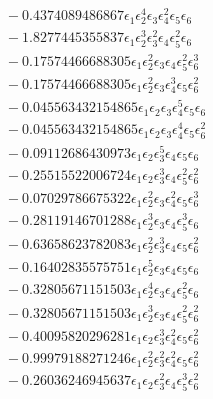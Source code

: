 \documentclass[10pt]{article}
\begin{document}
\begin{align*}
&{}  - 0.4374089486867 \epsilon_{1} \epsilon_{2}^{4} \epsilon_{3} \epsilon_{4}^{2} \epsilon_{5} \epsilon_{6} \\
&{}  - 1.8277445355837 \epsilon_{1} \epsilon_{2}^{3} \epsilon_{3}^{2} \epsilon_{4} \epsilon_{5}^{2} \epsilon_{6} \\
&{}  - 0.17574466688305 \epsilon_{1} \epsilon_{2}^{2} \epsilon_{3} \epsilon_{4} \epsilon_{5}^{2} \epsilon_{6}^{3} \\
&{}  - 0.17574466688305 \epsilon_{1} \epsilon_{2}^{2} \epsilon_{3} \epsilon_{4}^{3} \epsilon_{5} \epsilon_{6}^{2} \\
&{}  - 0.045563432154865 \epsilon_{1} \epsilon_{2} \epsilon_{3} \epsilon_{4}^{5} \epsilon_{5} \epsilon_{6} \\
&{}  - 0.045563432154865 \epsilon_{1} \epsilon_{2} \epsilon_{3} \epsilon_{4}^{4} \epsilon_{5} \epsilon_{6}^{2} \\
&{}  - 0.09112686430973 \epsilon_{1} \epsilon_{2} \epsilon_{3}^{5} \epsilon_{4} \epsilon_{5} \epsilon_{6} \\
&{}  - 0.25515522006724 \epsilon_{1} \epsilon_{2} \epsilon_{3}^{3} \epsilon_{4} \epsilon_{5}^{2} \epsilon_{6}^{2} \\
&{}  - 0.07029786675322 \epsilon_{1} \epsilon_{2}^{2} \epsilon_{3} \epsilon_{4}^{2} \epsilon_{5} \epsilon_{6}^{3} \\
&{}  - 0.28119146701288 \epsilon_{1} \epsilon_{2}^{3} \epsilon_{3} \epsilon_{4} \epsilon_{5}^{3} \epsilon_{6} \\
&{}  - 0.63658623782083 \epsilon_{1} \epsilon_{2}^{2} \epsilon_{3}^{3} \epsilon_{4} \epsilon_{5} \epsilon_{6}^{2} \\
&{}  - 0.16402835575751 \epsilon_{1} \epsilon_{2}^{5} \epsilon_{3} \epsilon_{4} \epsilon_{5} \epsilon_{6} \\
&{}  - 0.32805671151503 \epsilon_{1} \epsilon_{2}^{4} \epsilon_{3} \epsilon_{4} \epsilon_{5}^{2} \epsilon_{6} \\
&{}  - 0.32805671151503 \epsilon_{1} \epsilon_{2}^{3} \epsilon_{3} \epsilon_{4} \epsilon_{5}^{2} \epsilon_{6}^{2} \\
&{}  - 0.40095820296281 \epsilon_{1} \epsilon_{2} \epsilon_{3}^{3} \epsilon_{4}^{2} \epsilon_{5} \epsilon_{6}^{2} \\
&{}  - 0.99979188271246 \epsilon_{1} \epsilon_{2}^{2} \epsilon_{3}^{2} \epsilon_{4}^{2} \epsilon_{5} \epsilon_{6}^{2} \\
&{}  - 0.26036246945637 \epsilon_{1} \epsilon_{2} \epsilon_{3}^{2} \epsilon_{4} \epsilon_{5}^{3} \epsilon_{6}^{2} \\

\end{align*}
\end{document}
